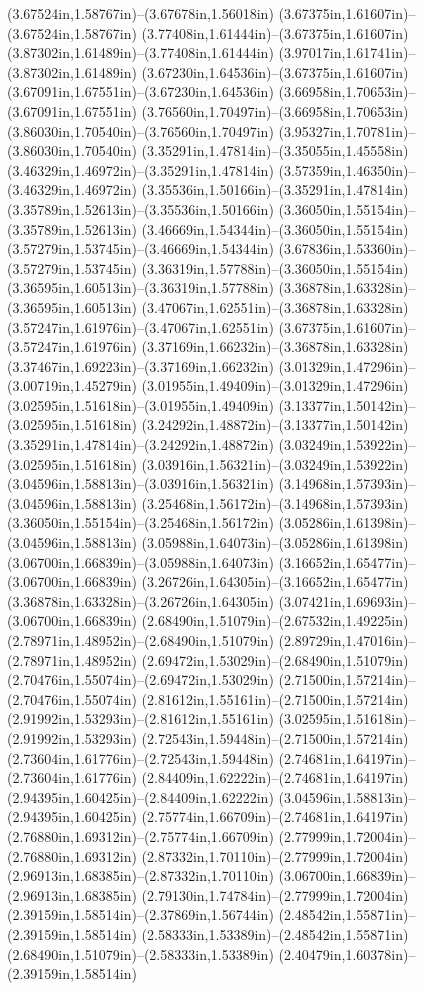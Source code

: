 (3.67524in,1.58767in)--(3.67678in,1.56018in) (3.67375in,1.61607in)--(3.67524in,1.58767in) (3.77408in,1.61444in)--(3.67375in,1.61607in) (3.87302in,1.61489in)--(3.77408in,1.61444in) (3.97017in,1.61741in)--(3.87302in,1.61489in) (3.67230in,1.64536in)--(3.67375in,1.61607in) (3.67091in,1.67551in)--(3.67230in,1.64536in) (3.66958in,1.70653in)--(3.67091in,1.67551in) (3.76560in,1.70497in)--(3.66958in,1.70653in) (3.86030in,1.70540in)--(3.76560in,1.70497in) (3.95327in,1.70781in)--(3.86030in,1.70540in) (3.35291in,1.47814in)--(3.35055in,1.45558in) (3.46329in,1.46972in)--(3.35291in,1.47814in) (3.57359in,1.46350in)--(3.46329in,1.46972in) (3.35536in,1.50166in)--(3.35291in,1.47814in) (3.35789in,1.52613in)--(3.35536in,1.50166in) (3.36050in,1.55154in)--(3.35789in,1.52613in) (3.46669in,1.54344in)--(3.36050in,1.55154in) (3.57279in,1.53745in)--(3.46669in,1.54344in) (3.67836in,1.53360in)--(3.57279in,1.53745in) (3.36319in,1.57788in)--(3.36050in,1.55154in) (3.36595in,1.60513in)--(3.36319in,1.57788in) (3.36878in,1.63328in)--(3.36595in,1.60513in) (3.47067in,1.62551in)--(3.36878in,1.63328in) (3.57247in,1.61976in)--(3.47067in,1.62551in) (3.67375in,1.61607in)--(3.57247in,1.61976in) (3.37169in,1.66232in)--(3.36878in,1.63328in) (3.37467in,1.69223in)--(3.37169in,1.66232in) (3.01329in,1.47296in)--(3.00719in,1.45279in) (3.01955in,1.49409in)--(3.01329in,1.47296in) (3.02595in,1.51618in)--(3.01955in,1.49409in) (3.13377in,1.50142in)--(3.02595in,1.51618in) (3.24292in,1.48872in)--(3.13377in,1.50142in) (3.35291in,1.47814in)--(3.24292in,1.48872in) (3.03249in,1.53922in)--(3.02595in,1.51618in) (3.03916in,1.56321in)--(3.03249in,1.53922in) (3.04596in,1.58813in)--(3.03916in,1.56321in) (3.14968in,1.57393in)--(3.04596in,1.58813in) (3.25468in,1.56172in)--(3.14968in,1.57393in) (3.36050in,1.55154in)--(3.25468in,1.56172in) (3.05286in,1.61398in)--(3.04596in,1.58813in) (3.05988in,1.64073in)--(3.05286in,1.61398in) (3.06700in,1.66839in)--(3.05988in,1.64073in) (3.16652in,1.65477in)--(3.06700in,1.66839in) (3.26726in,1.64305in)--(3.16652in,1.65477in) (3.36878in,1.63328in)--(3.26726in,1.64305in) (3.07421in,1.69693in)--(3.06700in,1.66839in) (2.68490in,1.51079in)--(2.67532in,1.49225in) (2.78971in,1.48952in)--(2.68490in,1.51079in) (2.89729in,1.47016in)--(2.78971in,1.48952in) (2.69472in,1.53029in)--(2.68490in,1.51079in) (2.70476in,1.55074in)--(2.69472in,1.53029in) (2.71500in,1.57214in)--(2.70476in,1.55074in) (2.81612in,1.55161in)--(2.71500in,1.57214in) (2.91992in,1.53293in)--(2.81612in,1.55161in) (3.02595in,1.51618in)--(2.91992in,1.53293in) (2.72543in,1.59448in)--(2.71500in,1.57214in) (2.73604in,1.61776in)--(2.72543in,1.59448in) (2.74681in,1.64197in)--(2.73604in,1.61776in) (2.84409in,1.62222in)--(2.74681in,1.64197in) (2.94395in,1.60425in)--(2.84409in,1.62222in) (3.04596in,1.58813in)--(2.94395in,1.60425in) (2.75774in,1.66709in)--(2.74681in,1.64197in) (2.76880in,1.69312in)--(2.75774in,1.66709in) (2.77999in,1.72004in)--(2.76880in,1.69312in) (2.87332in,1.70110in)--(2.77999in,1.72004in) (2.96913in,1.68385in)--(2.87332in,1.70110in) (3.06700in,1.66839in)--(2.96913in,1.68385in) (2.79130in,1.74784in)--(2.77999in,1.72004in) (2.39159in,1.58514in)--(2.37869in,1.56744in) (2.48542in,1.55871in)--(2.39159in,1.58514in) (2.58333in,1.53389in)--(2.48542in,1.55871in) (2.68490in,1.51079in)--(2.58333in,1.53389in) (2.40479in,1.60378in)--(2.39159in,1.58514in) 